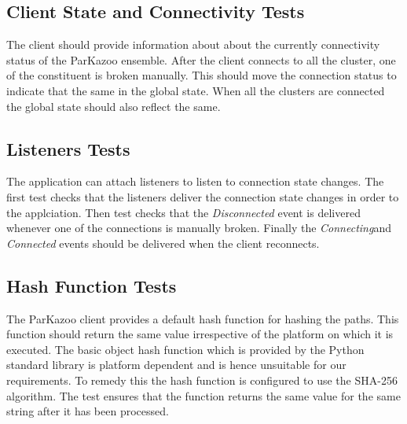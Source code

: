 \subsection{Client State and Connectivity Tests}
The client should provide information about about the currently connectivity status of the ParKazoo ensemble. After the client connects to all the cluster, one of the constituent is broken manually. This should move the connection status to indicate that the same in the global state. When all the clusters are connected the global state should also reflect the same.

\subsection{Listeners Tests}
The application can attach listeners to listen to connection state changes. The first test checks that the listeners deliver the connection state changes in order to the applciation. Then test checks that the \textit{Disconnected} event is delivered whenever one of the connections is manually broken. Finally the \textit{Connecting}and \textit{Connected} events should be delivered when the client reconnects.

\subsection{Hash Function Tests}
The ParKazoo client provides a default hash function for hashing the paths. This function should return the same value irrespective of the platform on which it is executed. The basic object hash function which is provided by the Python standard library is platform dependent and is hence unsuitable for our requirements. To remedy this the hash function is configured to use the SHA-256 algorithm. The test ensures that the function returns the same value for the same string after it has been processed.